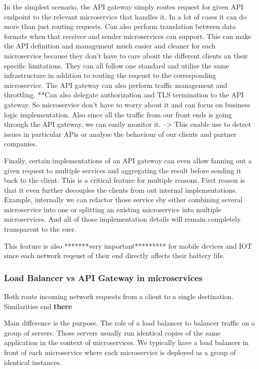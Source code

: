 \documentclass[a4paper, 11pt]{book}
\begin{document}
    In the simplest scenario, the API gateway simply routes request for given API endpoint to the relevant microservice that handles it.
    In a lot of cases it can do more than just routing requests.
    Can also perform translation between data formats when that receiver and sender microservices can support.
    This can make the API definition and management much easier and cleaner for each microservice because they don't have to care about the different clients an their specific limitations.
    They can all follow one standard and utilise the same infrastructure in addition to routing the reqeust to the corresponding microservice.
    The API gateway can also perform traffic management and throttling.
    **Can also delegate authorization and TLS termination to the API gateway.
    So microservice don't have to worry about it and can focus on business logic implementation.
    Also since all the traffic from our front ends is going through the API gateway, we can easily monitor it.
    --> This enable use to detect issues in particular APis or analyse the behaviour of our clients and partner companies.

    Finally, certain implementations of an API gateway can even allow fanning out a given request to multiple services and aggregating the result before sending it back to the client.
    This is a critical feature for multiple reasons.
    First reason is that it even further decouples the clients from out internal implementations.
    Example, internally we can refactor those service sby either combining several microservice into one or splitting an existing microservice into multiple microservices.
    And all of those implementation details will remain completely transparent to the suer.

    This feature is also *******very important********* for mobile devices and IOT since each network reqeust of their end directly affects their battery life.

    \subsubsection{Load Balancer vs API Gateway in microservices}
    Both route incoming network requests from a client to a single destination.
    Similarities end \textbf{there}

    Main difference is the purpose.
    The role of a load balancer to balancer traffic on a group of servers.
    Those servers usually run identical copies of the same application in the context of microservices.
    We typically have a load balancer in front of each microservice where each microservice is deployed as a group of identical instances.
\end{document}
